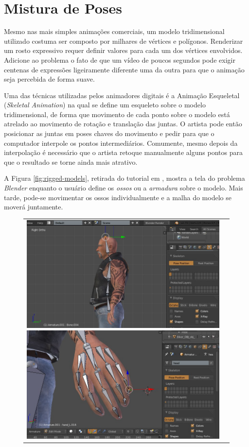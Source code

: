 {\section{Mistura de Poses}

	Mesmo nas mais simples animações comerciais, um modelo tridimensional utilizado costuma ser composto por milhares de vértices e polígonos. Renderizar um rosto expressivo requer definir valores para cada um dos vértices envolvidos. Adicione ao problema o fato de que um vídeo de poucos segundos pode exigir centenas de expressões ligeiramente diferente uma da outra para que o animação seja percebida de forma suave.
    
    Uma das técnicas utilizadas pelos animadores digitais é a Animação Esqueletal (\textit{Skeletal Animation}) na qual se define um esqueleto sobre o modelo tridimensional, de forma que movimento de cada ponto sobre o modelo está atrelado ao movimento de rotação e translação das juntas. O artista pode então posicionar as juntas em poses chaves do movimento e pedir para que o computador interpole os pontos intermediários. Comumente, mesmo depois da interpolação é necessário que o artista retoque manualmente alguns pontos para que o resultado se torne ainda mais atrativo.
    
    A Figura \ref{fig:rigged-models}, retirada do tutorial em \cite{rigs-tutorial}, mostra a tela do problema \textit{Blender} enquanto o usuário define os \textit{ossos} ou a \textit{armadura} sobre o modelo. Mais tarde, pode-se movimentar os ossos individualmente e a malha do modelo se moverá juntamente.
    
    
\begin{figure}[!htb]
   \centering
\begin{tabular}{cc}
  \includegraphics[width=0.4\linewidth]{./figs/blender_armature_image.jpg}
  \includegraphics[width=0.4\linewidth]{./figs/blender_armature_image_14.jpg}
\end{tabular}


\end{figure}}
